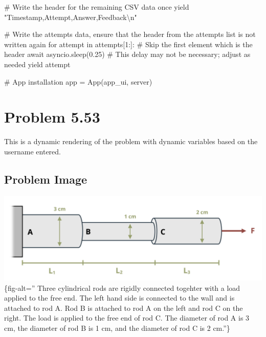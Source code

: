 \documentclass[
  letterpaper,
  DIV=11,
  numbers=noendperiod]{scrreprt}
\newenvironment{Shaded}{\begin{snugshade}}{\end{snugshade}}
\newcommand{\NormalTok}[1]{\textcolor[rgb]{0.00,0.23,0.31}{#1}}
\begin{document}
\begin{Shaded}
\begin{Highlighting}[]
\NormalTok{        \# Write the header for the remaining CSV data once}
\NormalTok{        yield "Timestamp,Attempt,Answer,Feedback\textbackslash{}n"}
        
\NormalTok{        \# Write the attempts data, ensure that the header from the attempts list is not written again}
\NormalTok{        for attempt in attempts[1:]:  \# Skip the first element which is the header}
\NormalTok{            await asyncio.sleep(0.25)  \# This delay may not be necessary; adjust as needed}
\NormalTok{            yield attempt}


\NormalTok{\# App installation}
\NormalTok{app = App(app\_ui, server)}
\end{Highlighting}
\end{Shaded}

\chapter*{Problem 5.53}\label{problem-5.53}


This is a dynamic rendering of the problem with dynamic variables based
on the username entered.

\section*{Problem Image}\label{problem-image-32}


\includegraphics{images/225.png}\{fig-alt='' Three cylindrical rods are
rigidly connected togehter with a load applied to the free end. The left
hand side is connected to the wall and is attached to rod A. Rod B is
attached to rod A on the left and rod C on the right. The load is
applied to the free end of rod C. The diameter of rod A is 3 cm, the
diameter of rod B is 1 cm, and the diameter of rod C is 2 cm.''\}
\end{document}
